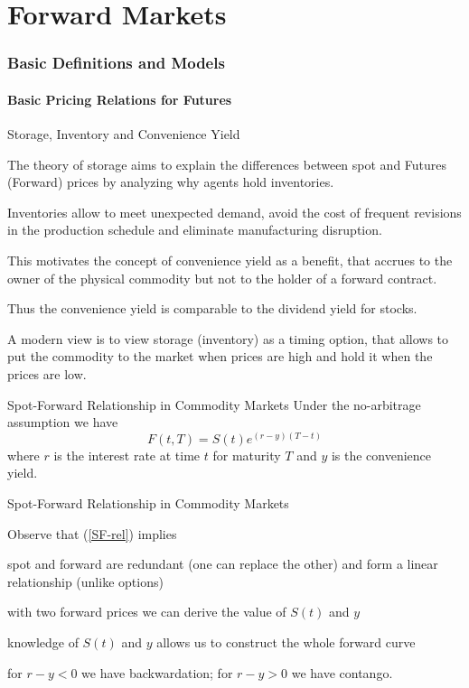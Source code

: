 \part{Forward Markets}
\section{Basic Definitions and Models}
\subsection{Basic Pricing Relations for Futures}

{Storage, Inventory and Convenience Yield}
\item<1-> The theory of storage aims to explain the differences between spot
and Futures (Forward) prices by analyzing why agents hold inventories.
\item<2-> Inventories
allow to meet unexpected demand, avoid the cost of frequent revisions in
the production schedule and eliminate manufacturing disruption.
\item<3-> This
motivates the concept of convenience yield as a benefit, that accrues to the
owner of the physical commodity but not to the holder of a forward contract.
\item<4-> Thus the convenience yield is comparable to the dividend yield for stocks.
\item<5-> A modern view is to view storage (inventory) as a timing option, that
allows to put the commodity to the market when prices are high
and hold it when the prices are low.

{Spot-Forward Relationship in Commodity Markets }
Under the no-arbitrage assumption we have
\begin{equation}\label{SF-rel}
F(t,T)=S(t)e^{(r-y)(T-t)}
\end{equation}
where $r$ is the interest rate at time $t$ for maturity $T$ and $y$ is the convenience yield.

{Spot-Forward Relationship in Commodity Markets }

Observe that (\ref{SF-rel}) implies
\item<1-> spot and forward are redundant (one can replace the other) and form a
linear relationship (unlike options)
\item<2-> with two forward prices we can derive the value of $S(t)$ and $y$
\item<3-> knowledge of $S(t)$ and $y$ allows us to construct the whole forward curve
\item<4-> for $r-y <0$ we have backwardation; for $r-y>0$ we have contango.

